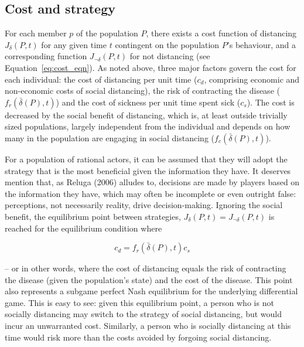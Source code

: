 \documentclass{article}
\begin{document}

\subsection{Cost and strategy} %
\label{sub:cost_and_strategy}

For each member $p$ of the population $P$, there exists a cost function of distancing $J_{\delta}(P, t)$ for any given time $t$ contingent on the population $P$'s behaviour, and a corresponding function $J_{\lnot \delta}(P, t)$ for not distancing (see Equation~\eqref{eq:cost_eqn}). As noted above, three major factors govern the cost for each individual: the cost of distancing per unit time ($c_d$, comprising economic and non-economic costs of social distancing), the risk of contracting the disease ($f_r(\bar{\delta}(P), t)$) and the cost of sickness per unit time spent sick ($c_s$). The cost is decreased by the social benefit of distancing, which is, at least outside trivially sized populations, largely independent from the individual and depends on how many in the population are engaging in social distancing ($f_c(\bar{\delta}(P), t)$).

For a population of rational actors, it can be assumed that they will adopt the strategy that is the most beneficial given the information they have. It deserves mention that, as Reluga (2006) alludes to, decisions are made by players based on the information they have,\cite{reluga2006evolving} which may often be incomplete or even outright false: perceptions, not necessarily reality, drive decision-making. Ignoring the social benefit, the equilibrium point between strategies, $J_{\delta}(P, t) = J_{\lnot \delta}(P, t)$ is reached for the equilibrium condition where

\begin{equation}
	c_d = f_r(\bar{\delta}(P), t) c_s
	\label{eq:cost_risk}
\end{equation}

\noindent -- or in other words, where the cost of distancing equals the risk of contracting the disease (given the population's state) and the cost of the disease. This point also represents a subgame perfect Nash equilibrium for the underlying differential game. This is easy to see: given this equilibrium point, a person who is not socially distancing may switch to the strategy of social distancing, but would incur an unwarranted cost. Similarly, a person who is socially distancing at this time would risk more than the costs avoided by forgoing social distancing. 
\end{document}
